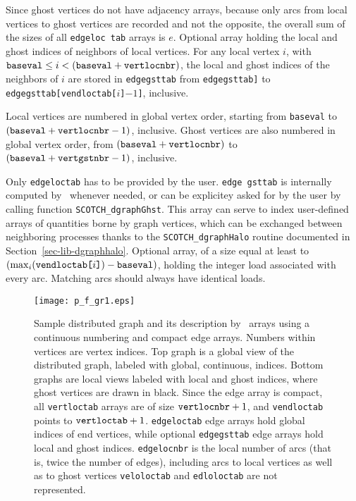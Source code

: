 \begin{itemize}
Since ghost vertices do not have adjacency arrays, because only arcs
from local vertices to ghost vertices are recorded and not the
opposite, the overall sum of the sizes of all {\tt edge\lbt loc\lbt
tab} arrays is $e$.
\iteme[{\tt edgegsttab}]
Optional array holding the local and ghost indices of neighbors of
local vertices.
For any local vertex $i$, with $\mbox{\tt baseval} \leq i < (\mbox{\tt
baseval} + \mbox{\tt vertlocnbr})$, the local and ghost indices
of the neighbors of $i$ are stored in {\tt edge\lbt gst\lbt tab}
from {\tt edge\lbt gst\lbt tab\lbt [vert\lbt loc\lbt tab[$i$]]} to
{\tt edge\lbt gst\lbt tab[vend\lbt loc\lbt tab[$i$]\lbt $- 1$]},
inclusive.

Local vertices are numbered in global vertex order,
starting from {\tt baseval} to $(\mbox{\tt baseval} +
\mbox{\tt vertlocnbr} - 1)$, inclusive. Ghost vertices are also
numbered in global vertex order, from $(\mbox{\tt baseval} +
\mbox{\tt vertlocnbr})$ to $(\mbox{\tt baseval} +
\mbox{\tt vertgstnbr} - 1)$, inclusive.

Only {\tt edgeloctab} has to be provided by the user. {\tt edge\lbt
gst\lbt tab} is internally computed by \ptscotch\ whenever needed,
or can be explicitey asked for by the user by calling function
{\tt SCOTCH\_\lbt dgraph\lbt Ghst}.
This array can serve to index user-defined arrays of quantities borne
by graph vertices, which can be exchanged between neighboring
processes thanks to the {\tt SCOTCH\_\lbt dgraph\lbt Halo}
routine documented in Section~\ref{sec-lib-dgraphhalo}.
\iteme[{\tt edloloctab}]
Optional array, of a size equal at least to $\left(\max_{i}(\mbox{\tt
vend\lbt loc\lbt tab[} i \mbox{\tt ]}) - \mbox{\tt baseval}\right)$,
holding the integer load associated with every arc. Matching arcs
should always have identical loads.
\end{itemize}

\begin{figure}
\centering\texttt{[image: p\_f\_gr1.eps]}
\caption{Sample distributed graph and its description by
\libscotch\ arrays using a continuous numbering and compact edge
arrays. Numbers within vertices are vertex indices. Top graph is a
global view of the distributed graph, labeled with global, continuous,
indices. Bottom graphs are local views labeled with local and ghost
indices, where ghost vertices are drawn in black.  Since the edge
array is compact, all {\tt vertloctab} arrays are of size $\mbox{\tt
vertlocnbr} + 1$, and {\tt vendloctab} points to $\mbox{\tt
vertloctab} + 1$. {\tt edgeloctab} edge arrays hold global indices
of end vertices, while optional {\tt edgegsttab} edge arrays hold
local and ghost indices. {\tt edgelocnbr} is the local number of arcs
(that is, twice the number of edges), including arcs to local vertices
as well as to ghost vertices {\tt veloloctab} and {\tt edloloctab} are
not represented.}
\label{fig-lib-dgraf-one}
\end{figure}

